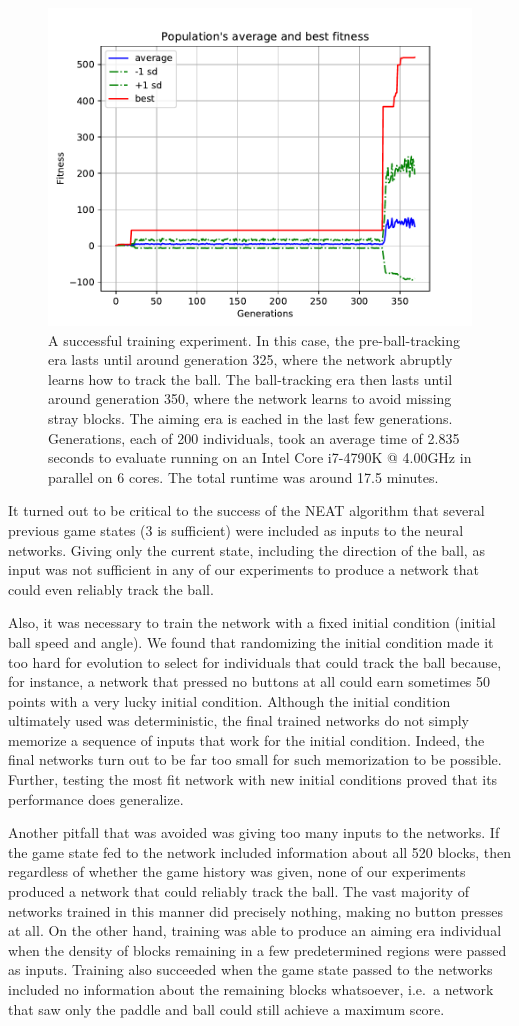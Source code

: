 \documentclass[letterpaper, twocolumn, conference]{article}
\begin{document}
\begin{figure}[h!]
    \centering
    \includegraphics[width=.54 \textwidth]{avg_fitness.pdf}
    \caption{A successful training experiment. In this case, the pre-ball-tracking era lasts
        until around generation 325, where the network abruptly learns how to track the ball.
        The ball-tracking era then lasts until around generation 350, where the network learns to avoid missing stray blocks. The aiming era is eached in the last few generations.
        Generations, each of 200 individuals, took an average time of 2.835 seconds to evaluate running on an
        Intel Core i7-4790K @ 4.00GHz in parallel on 6 cores. The total runtime was around 17.5 minutes.}
\end{figure}

It turned out to be critical to the success of the NEAT algorithm that several previous game states (3 is sufficient) were included as inputs to the neural networks.
Giving only the current state, including the direction of the ball, as input was not sufficient in any
of our experiments to produce a network that could even reliably track the ball.

Also, it was necessary to train the network with a fixed initial condition (initial ball speed and angle).
We found that randomizing the initial condition made it too hard for evolution to select for individuals
that could track the ball because, for instance,
a network that pressed no buttons at all could earn sometimes 50 points with a very lucky initial condition.
Although the initial condition ultimately used was deterministic,
the final trained networks do not simply memorize a sequence of inputs that work for the initial condition.
Indeed, the final networks turn out to be far too small for such memorization to be possible.
Further, testing the most fit network with new initial conditions proved that its performance does generalize.

Another pitfall that was avoided was giving too many inputs to the networks.
If the game state fed to the network
included information about all 520 blocks, then regardless of whether the game history was given,
none of our experiments produced a network that could reliably track the ball.
The vast majority of networks trained in this manner did precisely nothing, making no button presses
at all.
On the other hand, training was able to produce an aiming era individual
when the density of blocks remaining in a few predetermined regions were passed as inputs.
Training also succeeded when the game state passed to the networks included no information about the remaining blocks whatsoever, i.e.\ a network that saw only the paddle and ball could still achieve a maximum score.
\end{document}
